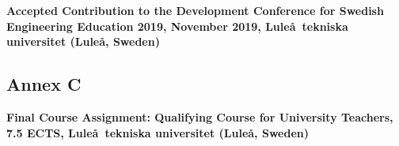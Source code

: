 \documentclass[
  a4paper, 
]{fortysecondscv}
\begin{document}
\textbf{Accepted Contribution to the Development Conference for Swedish Engineering Education 2019, November 2019, Lule\aa\ tekniska universitet (Lule\aa, Sweden)}

\newpage


\newpage
\makebacksidebar
\hrulefill\hspace{5pt}\textbf{\thepage}

\subsection{Annex C}

\textbf{Final Course Assignment: Qualifying Course for University Teachers, 7.5 ECTS, Lule\aa\ tekniska universitet (Lule\aa, Sweden)}

\newpage

\end{document}
